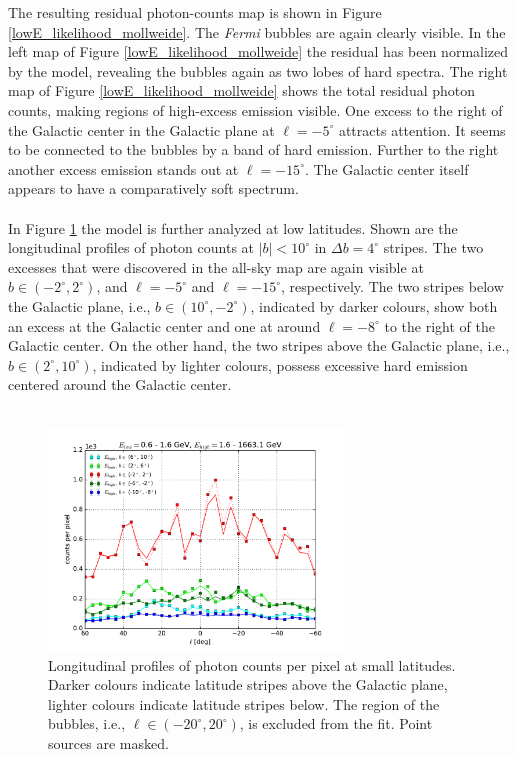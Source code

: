 \documentclass[a4paper]{article}
\begin{document}
The resulting residual photon-counts map is shown in Figure \ref{lowE_likelihood_mollweide}. The \textit{Fermi} bubbles are again clearly visible. In the left map of Figure \ref{lowE_likelihood_mollweide} the residual has been normalized by the model, revealing the bubbles again as two lobes of hard spectra. The right map of Figure \ref{lowE_likelihood_mollweide} shows the total residual photon counts, making regions of high-excess emission visible. One excess to the right of the Galactic center in the Galactic plane at $\ell = -5^\circ$ attracts attention. It seems to be connected to the bubbles by a band of hard emission. Further to the right another excess emission stands out at $\ell = -15^\circ$. The Galactic center itself appears to have a comparatively soft spectrum.\\
\\
In Figure \ref{lowE_likelihood_profiles} the model is further analyzed at low latitudes. Shown are the longitudinal profiles of photon counts at $|b| < 10^\circ$ in $\Delta b = 4^\circ$ stripes. The two excesses that were discovered in the all-sky map are again visible at $b \in (-2^\circ, 2^\circ)$, and $\ell = -5^\circ$ and $\ell = -15^\circ$, respectively. The two stripes below the Galactic plane, i.e., $b \in (10^\circ, -2^\circ)$, indicated by darker colours, show both an excess at the Galactic center and one at around $\ell = -8^\circ$ to the right of the Galactic center. On the other hand, the two stripes above the Galactic plane, i.e., $b \in (2^\circ, 10^\circ)$, indicated by lighter colours, possess excessive hard emission centered around the Galactic center.\\
\\
\begin{figure}[t]
	\centering
	\includegraphics[width=0.7\textwidth]{FitE_profile_plot_at_0-1_to_1-1663.pdf}
    \caption{Longitudinal profiles of photon counts per pixel at small latitudes. Darker colours indicate latitude stripes above the Galactic plane, lighter colours indicate latitude stripes below. The region of the bubbles, i.e., $\ell \in (-20^\circ,20^\circ)$, is excluded from the fit. Point sources are masked.}
    \label{lowE_likelihood_profiles}
\end{figure}
\end{document}

